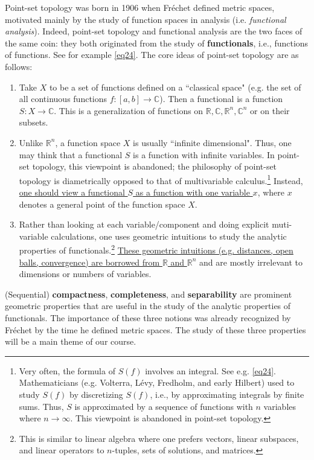 \documentclass[12pt,b5paper,notitlepage]{article}
\theoremstyle{definition}
\theoremstyle{plain}
\newcommand{\Cbb}{\mathbb C}
\newcommand{\Rbb}{\mathbb R}
\numberwithin{equation}{section}
\begin{document}
Point-set topology was born in 1906 when Fr\'echet defined metric spaces, motivated mainly by the study of function spaces in analysis (i.e. \emph{functional analysis}). Indeed, point-set topology and functional analysis are the two faces of the same coin: they both originated from the study of \textbf{functionals}, i.e., functions of functions. See for example \eqref{eq24}. The core ideas of point-set topology are as follows:
\begin{enumerate}[label=(\arabic*)]
\item Take $X$ to be a set of functions defined on a ``classical space" (e.g. the set of all continuous functions $f:[a,b]\rightarrow\Cbb$). Then a functional is a function  $S:X\rightarrow \Cbb$. This is a generalization of functions on $\Rbb,\Cbb,\Rbb^n,\Cbb^n$ or on their subsets.
\item Unlike $\Rbb^n$, a function space $X$ is usually ``infinite dimensional". Thus, one may think that a functional $S$ is a function with infinite variables. In point-set topology, this viewpoint is abandoned; the philosophy of point-set topology is diametrically opposed to that of multivariable calculus.\footnote{Very often, the formula of $S(f)$ involves an integral. See e.g. \eqref{eq24}. Mathematicians (e.g. Volterra, L\'evy, Fredholm, and early Hilbert) used to study $S(f)$ by discretizing $S(f)$, i.e., by approximating integrals by finite sums. Thus, $S$ is approximated by a sequence of functions with $n$ variables where $n\rightarrow\infty$. This viewpoint is abandoned in point-set topology.} Instead, \ul{one should view a functional $S$ as a function with one variable $x$}, where $x$ denotes a general point of the function space $X$.
\item Rather than looking at each variable/component and doing explicit muti-variable calculations, one uses geometric intuitions to study the analytic properties of functionals.\footnote{This is similar to linear algebra where one prefers vectors, linear subspaces, and linear operators to $n$-tuples, sets of solutions, and matrices.} \ul{These geometric intuitions (e.g. distances, open balls, convergence) are borrowed from  $\Rbb$ and $\Rbb^n$}  and are mostly irrelevant to dimensions or numbers of variables.
\end{enumerate}



(Sequential) \textbf{compactness}, \textbf{completeness}, and \textbf{separability} are prominent geometric properties that are useful in the study of the analytic properties of functionals. The importance of these three notions  was  already recognized by Fr\'echet by the time he defined metric spaces. The study of these three properties will be a main theme of our course.
\end{document}
